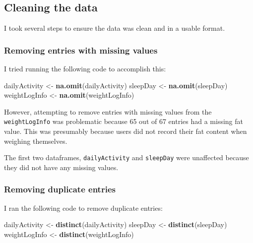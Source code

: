 \documentclass[
]{article}
\newenvironment{Shaded}{\begin{snugshade}}{\end{snugshade}}
\newcommand{\FunctionTok}[1]{\textcolor[rgb]{0.13,0.29,0.53}{\textbf{#1}}}
\newcommand{\NormalTok}[1]{#1}
\newcommand{\OtherTok}[1]{\textcolor[rgb]{0.56,0.35,0.01}{#1}}
\begin{document}
\hypertarget{cleaning-the-data}{%
\subsection{Cleaning the data}\label{cleaning-the-data}}

I took several steps to ensure the data was clean and in a usable
format.

\hypertarget{removing-entries-with-missing-values}{%
\subsubsection{Removing entries with missing
values}\label{removing-entries-with-missing-values}}

I tried running the following code to accomplish this:

\begin{Shaded}
\begin{Highlighting}[]
\NormalTok{dailyActivity }\OtherTok{\textless{}{-}} \FunctionTok{na.omit}\NormalTok{(dailyActivity)}
\NormalTok{sleepDay }\OtherTok{\textless{}{-}} \FunctionTok{na.omit}\NormalTok{(sleepDay)}
\NormalTok{weightLogInfo }\OtherTok{\textless{}{-}} \FunctionTok{na.omit}\NormalTok{(weightLogInfo)}
\end{Highlighting}
\end{Shaded}

However, attempting to remove entries with missing values from the
\texttt{weightLogInfo} was problematic because 65 out of 67 entries had
a missing fat value. This was presumably because users did not record
their fat content when weighing themselves.

The first two dataframes, \texttt{dailyActivity} and \texttt{sleepDay}
were unaffected because they did not have any missing values.

\hypertarget{removing-duplicate-entries}{%
\subsubsection{Removing duplicate
entries}\label{removing-duplicate-entries}}

I ran the following code to remove duplicate entries:

\begin{Shaded}
\begin{Highlighting}[]
\NormalTok{dailyActivity }\OtherTok{\textless{}{-}} \FunctionTok{distinct}\NormalTok{(dailyActivity)}
\NormalTok{sleepDay }\OtherTok{\textless{}{-}} \FunctionTok{distinct}\NormalTok{(sleepDay)}
\NormalTok{weightLogInfo }\OtherTok{\textless{}{-}} \FunctionTok{distinct}\NormalTok{(weightLogInfo)}
\end{Highlighting}
\end{Shaded}
\end{document}
